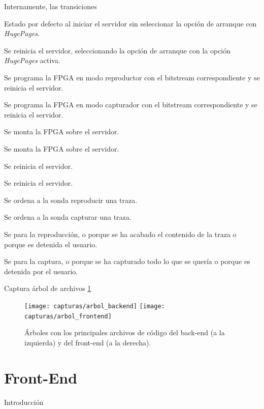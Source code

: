 Internamente, las transiciones
\begin{enumerate}[label={\bfseries [\arabic*]}]
  \item Estado por defecto al iniciar el servidor sin seleccionar la opción de arranque con \textit{HugePages}.
  \item Se reinicia el servidor, seleccionando la opción de arranque con la opción \textit{HugePages} activa.
  \item Se programa la \gls{FPGA} en modo reproductor con el \gls{bitstream} correspondiente y se reinicia el servidor.
  \item Se programa la \gls{FPGA} en modo capturador con el \gls{bitstream} correspondiente y se reinicia el servidor.
  \item Se monta la \gls{FPGA} sobre el servidor.
  \item Se monta la \gls{FPGA} sobre el servidor.
  \item Se reinicia el servidor.
  \item Se reinicia el servidor.
  \item Se ordena a la sonda reproducir una \gls{traza}.
  \item Se ordena a la sonda capturar una \gls{traza}.
  \item Se para la reproducción, o porque se ha acabado el contenido de la \gls{traza} o porque es detenida el usuario.
  \item Se para la captura, o porque se ha capturado todo lo que se quería o porque es detenida por el usuario.
\end{enumerate}


Captura árbol de archivos \ref{fig:arbol_codigo}

\begin{figure}[!htp]
  \begin{center}
    \texttt{[image: capturas/arbol\_backend]}
    \hspace{1cm}
    \texttt{[image: capturas/arbol\_frontend]}
  \caption{Árboles con los principales archivos de código del \gls{back-end} (a la izquierda) y del \gls{front-end} (a la derecha).}
  \label{fig:arbol_codigo}
  \end{center}
\end{figure}


\section{Front-End\label{sec:imp:front_end}}

Introducción

